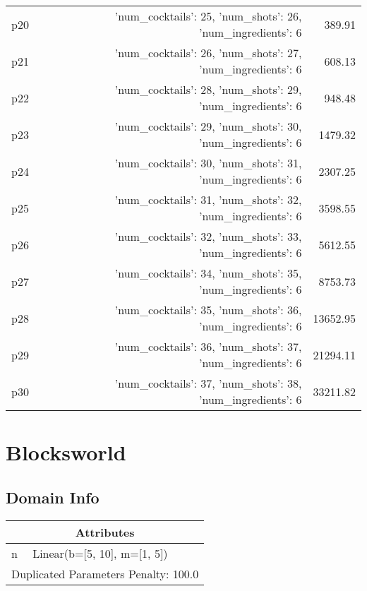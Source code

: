 \documentclass{article}
\begin{document}
\begin{center}
\begin{tabular}{@{}l|r|r@{}}
  p20&{'num\_cocktails': 25, 'num\_shots': 26, 'num\_ingredients': 6}&389.91\\
  p21&{'num\_cocktails': 26, 'num\_shots': 27, 'num\_ingredients': 6}&608.13\\
  p22&{'num\_cocktails': 28, 'num\_shots': 29, 'num\_ingredients': 6}&948.48\\
  p23&{'num\_cocktails': 29, 'num\_shots': 30, 'num\_ingredients': 6}&1479.32\\
  p24&{'num\_cocktails': 30, 'num\_shots': 31, 'num\_ingredients': 6}&2307.25\\
  p25&{'num\_cocktails': 31, 'num\_shots': 32, 'num\_ingredients': 6}&3598.55\\
  p26&{'num\_cocktails': 32, 'num\_shots': 33, 'num\_ingredients': 6}&5612.55\\
  p27&{'num\_cocktails': 34, 'num\_shots': 35, 'num\_ingredients': 6}&8753.73\\
  p28&{'num\_cocktails': 35, 'num\_shots': 36, 'num\_ingredients': 6}&13652.95\\
  p29&{'num\_cocktails': 36, 'num\_shots': 37, 'num\_ingredients': 6}&21294.11\\
  p30&{'num\_cocktails': 37, 'num\_shots': 38, 'num\_ingredients': 6}&33211.82
                            \end{tabular}
                            \end{center}
                    
                            \newpage \section{Blocksworld}
                    \subsection*{Domain Info}

                    \begin{center}
                    \begin{tabular}{@{}p{}p{}@{}}
                    \multicolumn{2}{c}{\bf \large Attributes}\\\midrule
                    n & Linear(b=[5, 10], m=[1, 5])
                    
                     \\\midrule
                    \multicolumn{2}{l}{Duplicated Parameters Penalty: 100.0}
                    \end{tabular}
                    \end{center}
                
\end{document}
